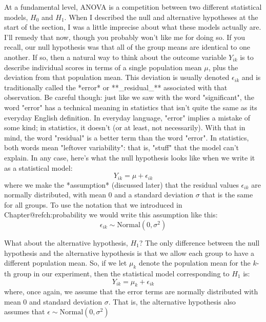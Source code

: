 At a fundamental level, ANOVA is a competition between two different statistical models, $H_0$ and $H_1$. When I described the null and alternative hypotheses at the start of the section, I was a little imprecise about what these models actually are. I'll remedy that now, though you probably won't like me for doing so. If you recall, our null hypothesis was that all of the group means are identical to one another. If so, then a natural way to think about the outcome variable $Y_{ik}$ is to describe individual scores in terms of a single population mean $\mu$, plus the deviation from that population mean. This deviation is usually denoted $\epsilon_{ik}$ and is traditionally called the *error* or **_residual_** associated with that observation. Be careful though: just like we saw with the word "significant", the word "error" has a technical meaning in statistics that isn't quite the same as its everyday English definition. In everyday language, "error" implies a mistake of some kind; in statistics, it doesn't (or at least, not necessarily). With that in mind, the word "residual" is a better term than the word "error". In statistics, both words mean "leftover variability": that is, "stuff" that the model can't explain. In any case, here's what the null hypothesis looks like when we write it as a statistical model:
$$
Y_{ik} = \mu + \epsilon_{ik}
$$
where we make the *assumption* (discussed later) that the residual values $\epsilon_{ik}$ are normally distributed, with mean 0 and a standard deviation $\sigma$ that is the same for all groups. To use the notation that we introduced in Chapter@refch:probability we would write this assumption like this:
$$
\epsilon_{ik} \sim \mbox{Normal}(0, \sigma^2)
$$

What about the alternative hypothesis, $H_1$? The only difference between the null hypothesis and the alternative hypothesis is that we allow each group to have a different population mean. So, if we let $\mu_k$ denote the population mean for the $k$-th group in our experiment, then the statistical model corresponding to $H_1$ is:
$$
Y_{ik} = \mu_k + \epsilon_{ik}
$$
where, once again, we assume that the error terms are normally distributed with mean 0 and standard deviation $\sigma$. That is, the alternative hypothesis also assumes that 
$
\epsilon \sim \mbox{Normal}(0, \sigma^2)
$

